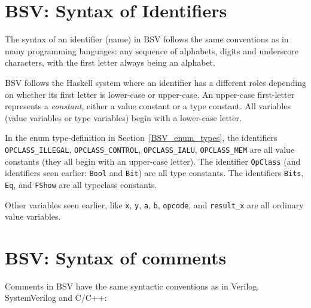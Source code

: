 
\section{BSV: Syntax of Identifiers}

\label{BSV_Syntax_of_Identifiers}


The syntax of an identifier (name) in BSV follows the same conventions
as in many programming languages: any sequence of alphabets, digits
and underscore characters, with the first letter always being an
alphabet.


BSV follows the Haskell system where an identifier has a different
roles depending on whether its first letter is lower-case or
upper-case.  An upper-case first-letter represents a \emph{constant},
either a value constant or a type constant.  All variables (value
variables or type variables) begin with a lower-case letter.

In the enum type-definition in Section~\ref{BSV_enum_types}, the
identifiers \verb|OPCLASS_ILLEGAL|, \verb|OPCLASS_CONTROL|,
\verb|OPCLASS_IALU|, \verb|OPCLASS_MEM| are all value constants (they
all begin with an upper-case letter).  The identifier \verb|OpClass|
(and identifiers seen earlier: \verb|Bool| and \verb|Bit|) are all
type constants.  The identifiers \verb|Bits|, \verb|Eq|, and
\verb|FShow| are all typeclass constants.

Other variables seen earlier, like \verb|x|, \verb|y|, \verb|a|,
\verb|b|, \verb|opcode|, and \verb|result_x| are all ordinary value
variables.


\section{BSV: Syntax of comments}

\label{BSV_Syntax_of_comments}


Comments in BSV have the same syntactic conventions as in Verilog,
SystemVerilog and C/C++:

